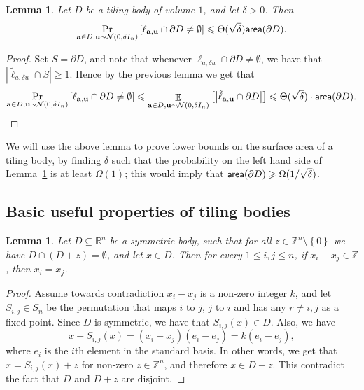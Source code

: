 \documentclass[10pt,a4paper]{article}
\newtheorem{lemma}[thm]{Lemma}
\newcommand\card[1]{\left| {#1} \right|}
\newcommand\set[1]{{\left\{ #1 \right\}}}
\newcommand\Prob[2]{{\Pr_{#1}\left[ {#2} \right]}}
\newcommand\Expect[2]{{\mathop{\mathbb{E}}_{#1}\left[ {#2} \right]}}
\renewcommand\geq{\geqslant}
\renewcommand\leq{\leqslant}
\begin{document}
\begin{lemma}\label{lem:area_bd}
  Let $D$ be a tiling body of volume $1$, and let $\delta>0$. Then
  \[
    \Prob{{\bf a}\in D, {\bf u}\sim\mathcal{N}(0,\delta I_n)}{\ell_{{\bf a},{\bf u}}\cap \partial D\neq \emptyset} \leq \Theta(\sqrt{\delta}) {\sf area}(\partial D).
  \]
\end{lemma}
\begin{proof}
  Set $S = \partial D$, and note that whenever $\ell_{a,\delta u}\cap \partial D\neq \emptyset$, we have that $\card{\tilde{\ell}_{a,\delta u}\cap S}\geq 1$.
  Hence by the previous lemma we get that
  \[
  \Prob{{\bf a}\in D, {\bf u}\sim\mathcal{N}(0,\delta I_n)}{\ell_{{\bf a},{\bf u}}\cap \partial D\neq \emptyset}
  \leq
  \Expect{{\bf a}\in D, {\bf u}\sim\mathcal{N}(0,\delta I_n)}{\card{\tilde{\ell}_{{\bf a},{\bf u}}\cap \partial D}}
  \leq  \Theta(\sqrt{\delta}) \cdot {\sf area}(\partial D).
  \qedhere
  \]
\end{proof}
We will use the above lemma to prove lower bounds on the surface area of a tiling body, by finding $\delta$ such that
the probability on the left hand side of Lemma~\ref{lem:area_bd} is at least $\Omega(1)$; this would imply that
${\sf area}(\partial D)\geq \Omega(1/\sqrt{\delta})$.

\subsection{Basic useful properties of tiling bodies}
\begin{lemma}\label{lem:diff}
  Let $D\subseteq \mathbb{R}^n$ be a symmetric body, such that for all $z\in\mathbb{Z}^n\setminus\set{0}$
  we have $D\cap (D+z)  = \emptyset$, and let $x\in D$. Then for every $1\leq i,j\leq n$,
  if $x_i - x_j \in \mathbb{Z}$, then $x_i = x_j$.
\end{lemma}
\begin{proof}
  Assume towards contradiction $x_i - x_j$ is a non-zero integer $k$, and let $S_{i,j}\in S_n$ be the permutation that
  maps $i$ to $j$, $j$ to $i$ and has any $r\neq i,j$ as a fixed point. Since $D$ is symmetric, we have
  that $S_{i,j}(x)\in D$. Also, we have
  \[
    x - S_{i,j}(x) = (x_i - x_j) (e_i - e_j) = k(e_i-e_j),
  \]
  where $e_i$ is the $i$th element in the standard basis. In other words, we get that $x = S_{i,j}(x) + z$ for non-zero $z\in \mathbb{Z}^n$,
  and therefore $x\in D + z$. This contradict the fact that $D$ and $D+z$ are disjoint.
\end{proof}
\end{document}
